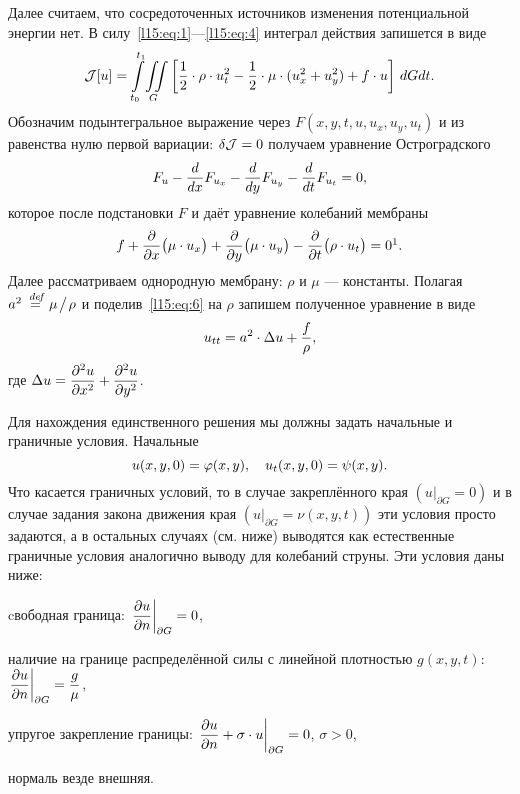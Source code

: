 Далее считаем, что сосредоточенных источников изменения потенциальной энергии нет. В силу~\eqref{l15:eq:1}---\eqref{l15:eq:4} интеграл действия запишется в виде
\begin{equation*}
	\hfill\J[u]=\int\limits_{t_0}^{t_1}\!\iint\limits_{G}\left[\frac{1}{2}\cdot\rho\cdot u_t^2-\frac{1}{2}\cdot\mu\cdot(u_x^2+u_y^2)+f\cdot u\right]\,dGdt.\hfill
\end{equation*}
Обозначим подынтегральное выражение через $F(x,y,t,u,u_x,u_y,u_t)$ и из равенства нулю первой вариации: $\delta\mathcal{J}=0$ получаем уравнение Остроградского
\begin{equation*}
	\hfill F_u-\der{}{x}F_{u_x}-\der{}{y}F_{u_y}-\der{}{t}F_{u_t}=0,\hfill
\end{equation*}
которое после подстановки $F$ и даёт уравнение колебаний мембраны
\begin{equation}\label{l15:eq:6}
	\hfill f+\pder{}{x}\big(\mu\cdot u_x\big)+\pder{}{y}\big(\mu\cdot u_y\big)-\pder{}{t}\big(\rho\cdot u_t\big)=0\footnotemark{}.\hfill
\end{equation}%
Далее рассматриваем однородную мембрану: $\rho$ и $\mu$ --- константы. Полагая $a^2\stackrel{\hspace{0.09 cm}de\!f}{=}\mu\!\bigm/\!\rho$ и поделив~\eqref{l15:eq:6} на $\rho$ запишем полученное уравнение в виде
\begin{equation}\label{l15:eq:7}
	\hfill u_{tt}=a^2\cdot\Delta u+\frac{f}{\rho},\hfill
\end{equation}
где $\displaystyle\Delta u=\frac{\partial^2u}{\partial x^2}+\frac{\partial^2u}{\partial y^2}$.

Для нахождения единственного решения мы должны задать начальные и граничные условия. Начальные
\begin{equation}\label{l15:eq:8}
	\hfill u(x,y,0)=\phi(x,y),\quad u_t(x,y,0)=\psi(x,y).\hfill
\end{equation}
Что касается граничных условий, то в случае закреплённого края $\left(u\Big|_{\partial G}=0\right)$ и в случае задания закона движения края $\left(u\Big|_{\partial G}=\nu(x,y,t)\right)$ эти условия просто задаются, а в остальных случаях (см. ниже) выводятся как естественные граничные условия аналогично выводу для колебаний струны. Эти условия даны ниже:
\begin{enumerateD}
	\item cвободная граница: $\displaystyle \left.\frac{\partial u}{\partial n}\right|_{\partial G}=0$,
	\item наличие на границе распределённой силы с линейной плотностью $g(x,y,t)$: $\displaystyle \left.\frac{\partial u}{\partial n}\right|_{\partial G}=\frac{g}{\mu}$,
	\item упругое закрепление границы: $\displaystyle\left.\frac{\partial u}{\partial n}+\sigma\cdot u\right|_{\partial G}=0$, $\sigma>0$, 
\end{enumerateD}
нормаль везде внешняя.

